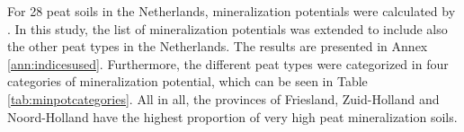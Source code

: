 {%


For 28 peat soils in the Netherlands, mineralization potentials were calculated by \citep{stouthamer2008toelichting}.  In this study,  the list of mineralization potentials was extended to include also the other peat types in the Netherlands. The results are presented in Annex \ref{ann:indicesused}. Furthermore, the different peat types were categorized in four categories of mineralization potential, which can be seen in Table \ref{tab:minpotcategories}. 
All in all, the provinces of Friesland, Zuid-Holland and Noord-Holland have the highest proportion of very high peat mineralization soils.

}
